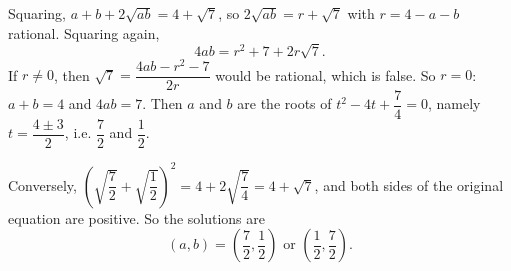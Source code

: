 Squaring, $a+b+2\sqrt{ab}=4+\sqrt7$, so $2\sqrt{ab}=r+\sqrt7$ with $r=4-a-b$ rational. Squaring again,
\[4ab=r^2+7+2r\sqrt7.\]
If $r\ne0$, then $\sqrt7=\dfrac{4ab-r^2-7}{2r}$ would be rational, which is false. So $r=0$: $a+b=4$ and $4ab=7$. Then $a$ and $b$ are the roots of $t^2-4t+\dfrac74=0$, namely $t=\dfrac{4\pm3}{2}$, i.e. $\dfrac72$ and $\dfrac12$.

Conversely, $\left(\sqrt{\dfrac72}+\sqrt{\dfrac12}\right)^2=4+2\sqrt{\dfrac74}=4+\sqrt7$, and both sides of the original equation are positive. So the solutions are
\[\boxed{(a,b)=\left(\dfrac72,\dfrac12\right)\text{ or }\left(\dfrac12,\dfrac72\right)}.\]
